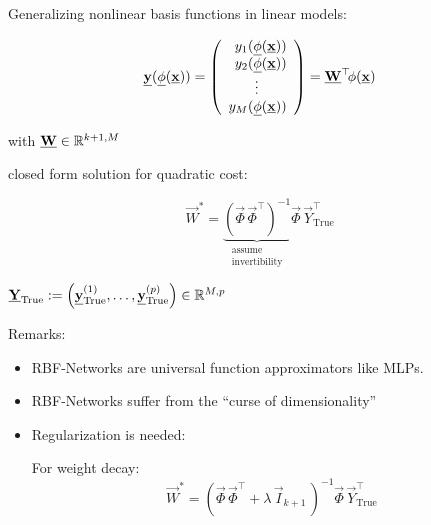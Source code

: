 \begin{frame}\frametitle{\subsecname}

Generalizing nonlinear basis functions in linear models:

\begin{equation}
\underline{\mathbf{y}}(\underline{\mathbf{\phi}}(\underline{\mathbf{x}})) = 
\left( \begin{array}{rrrrrrrrrrrrrrrrrrrrrrrrrr} 
y_1(\underline{\mathbf{\phi}}(\underline{\mathbf{x}}))\\
y_2(\underline{\mathbf{\phi}}(\underline{\mathbf{x}}))\\
\vdots\qquad\\
y_M(\underline{\mathbf{\phi}}(\underline{\mathbf{x}}))
\\ \end{array} \right)
= \underline{\mathbf{W}}^\top \kern-.5ex \phi(\underline{\mathbf{x}})
\end{equation}

\svspace{-3mm}

with $\underline{\mathbf{W}} \in \mathbb{R}^{k+1,M}$

closed form solution for quadratic cost: 

\begin{equation}
\vec W^{*} =
\underbrace{
\left(\vec \Phi \, \vec \Phi^{\top} \right)^{-1}
}_{
\substack{
\text{assume}\\ \text{invertibility}}
}
\vec \Phi \, \vec Y_{\text{True}}^{\top}
\end{equation}


\pause

\svspace{-3mm}

 $\underline{\mathbf{Y}}_{\text{True}} := \left( \underline{\mathbf{y}}_{\text{True}}^{(1)},\ldots,\underline{\mathbf{y}}_{\text{True}}^{(p)}\right) \in \mathbb{R}^{M,p}$

\end{frame}

\begin{frame}
Remarks:

\begin{itemize}
\item RBF-Networks are universal function approximators like MLPs.
\item RBF-Networks suffer from the ``curse of dimensionality''
\item Regularization is needed:

For weight decay:
\begin{equation}
\vec W^{*} = \left( \vec \Phi \, \vec \Phi^{\top} + \lambda\,\vec I_{k+1} \,\right)^{-1} \vec \Phi \, \vec Y_{\text{True}}^{\top}
\end{equation}

\end{itemize}

\end{frame}

